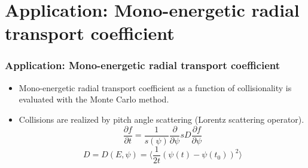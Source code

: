 \documentclass{beamer}
\newcommand{\be}[1]{\begin{equation} \label{#1}}
\newcommand{\ee}{\end{equation}}
\begin{document}
\section{Application: Mono-energetic radial transport coefficient}


\begin{frame}
\frametitle{Application: Mono-energetic radial transport coefficient}
\vspace{-0.5cm}
\begin{itemize}
	\item Mono-energetic radial transport coefficient as a function of collisionality is evaluated with the Monte Carlo method.
	\item Collisions are realized by pitch angle scattering (Lorentz scattering operator).\\
	\be{}
	\frac{\partial f}{\partial t} = \frac{1}{s \left(\psi \right)} \frac{\partial}{\partial \psi}s D 	\frac{\partial f}{\partial \psi} 
	\ee
	\be{}
	D = D(E,\psi) = \langle \frac{1}{2t} \left( \psi  \left(t\right) - \psi \left( t_0 \right) \right)^2 \rangle
	\ee
\end{itemize}
\end{frame}
\end{document}
